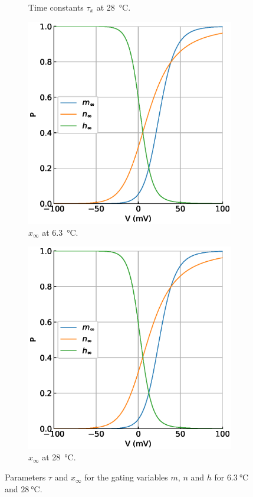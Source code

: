 \documentclass{scrartcl}			%
\begin{document}
\begin{figure}[H]
\begin{subfigure}[b]{0.5\linewidth}
    \caption{Time constants  $\tau_x$ at \SI{28}{\celsius}.} 
    \label{fig:tc_28} 
    \quad
  \end{subfigure} 
  \begin{subfigure}[b]{0.5\linewidth}
    \centering
    \includegraphics[width=\linewidth]{imgs/x_at_6.eps} 
    \caption{$x_\infty$ at \SI{6.3}{\celsius}.} 
    \label{fig:x_63} 
  \end{subfigure}%
  \begin{subfigure}[b]{0.5\linewidth}
    \centering
    \includegraphics[width=\linewidth]{imgs/x_at_28.eps} 
    \caption{$x_\infty$ at \SI{28}{\celsius}.} 
    \label{fig:x_28} 
    \end{subfigure} 
  \caption{Parameters $\tau$ and $x_\infty$ for the gating variables $m$, $n$ and $h$ for $\SI{6.3}{\celsius}$ and  $\SI{28}{\celsius}$.}
  \label{fig:tx} 
\end{figure}
\end{document}
